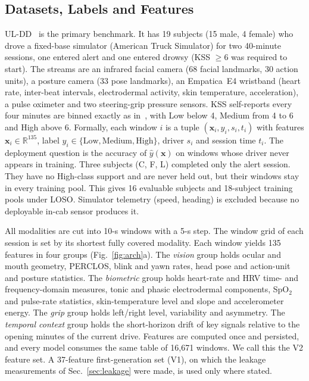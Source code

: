 \documentclass[journal]{IEEEtran}
\begin{document}
\subsection{Datasets, Labels and Features}
\label{sec:data}
UL-DD~\cite{bodaghi2026uldd} is the primary benchmark. It has 19 subjects (15
male, 4 female) who drove a fixed-base simulator (American Truck Simulator)
for two 40-minute sessions, one entered alert and one entered drowsy (KSS
$\ge 6$ was required to start). The streams are an infrared facial camera (68
facial landmarks, 30 action units), a posture camera (33 pose landmarks), an
Empatica~E4 wristband (heart rate, inter-beat intervals, electrodermal
activity, skin temperature, acceleration), a pulse oximeter and two
steering-grip pressure sensors. KSS self-reports every four minutes are binned
exactly as in~\cite{bodaghi2026uldd}, with Low below 4, Medium from 4 to 6
and High above 6. Formally, each window $i$ is a tuple
$(\mathbf{x}_i,y_i,s_i,t_i)$ with features $\mathbf{x}_i\in\mathbb{R}^{135}$,
label $y_i\in\{\text{Low},\text{Medium},\text{High}\}$, driver $s_i$ and
session time $t_i$. The deployment question is the accuracy of
$\hat y(\mathbf{x})$ on windows whose driver never appears in training. Three
subjects (C, F, L) completed only the alert session. They have no High-class
support and are never held out, but their windows stay in every training
pool. This gives 16 evaluable subjects and 18-subject training pools under
LOSO. Simulator telemetry (speed, heading) is excluded because no deployable
in-cab sensor produces it.

All modalities are cut into 10-s windows with a 5-s step. The window grid of
each session is set by its shortest fully covered modality. Each window yields
135 features in four groups (Fig.~\ref{fig:arch}a). The \emph{vision} group
holds ocular and mouth geometry, PERCLOS, blink and yawn rates, head pose and
action-unit and posture statistics. The \emph{biometric} group holds
heart-rate and HRV time- and frequency-domain measures, tonic and phasic
electrodermal components, SpO$_2$ and pulse-rate statistics, skin-temperature
level and slope and accelerometer energy. The \emph{grip} group holds
left/right level, variability and asymmetry. The \emph{temporal context}
group holds the short-horizon drift of key signals relative to the opening
minutes of the current drive. Features are computed once and persisted, and
every model consumes the same table of 16{,}671 windows. We call this the V2
feature set. A 37-feature first-generation set (V1), on which the leakage
measurements of Sec.~\ref{sec:leakage} were made, is used only where stated.
\end{document}
